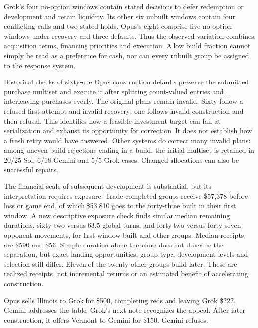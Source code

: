 Grok's four no-option windows contain stated decisions to defer redemption or development and retain liquidity. Its other six unbuilt windows contain four conflicting calls and two stated holds. Opus's eight comprise five no-option windows under recovery and three defaults. Thus the observed variation combines acquisition terms, financing priorities and execution. A low build fraction cannot simply be read as a preference for cash, nor can every unbuilt group be assigned to the response system.

Historical checks of sixty-one Opus construction defaults preserve the submitted purchase multiset and execute it after splitting count-valued entries and interleaving purchases evenly. The original plans remain invalid. Sixty follow a refused first attempt and invalid recovery; one follows invalid construction and then refusal. This identifies how a feasible investment target can fail at serialization and exhaust its opportunity for correction. It does not establish how a fresh retry would have answered. Other systems do correct many invalid plans: among uneven-build rejections ending in a build, the initial multiset is retained in 20/25 Sol, 6/18 Gemini and 5/5 Grok cases. Changed allocations can also be successful repairs.

The financial scale of subsequent development is substantial, but its interpretation requires exposure. Trade-completed groups receive \$57,378 before loss or game end, of which \$53,810 goes to the forty-three built in their first window. A new descriptive exposure check finds similar median remaining durations, sixty-two versus 63.5 global turns, and forty-two versus forty-seven opponent movements, for first-window-built and other groups. Median receipts are \$590 and \$56. Simple duration alone therefore does not describe the separation, but exact landing opportunities, group type, development levels and selection still differ. Eleven of the twenty other groups build later. These are realized receipts, not incremental returns or an estimated benefit of accelerating construction.

Opus sells Illinois to Grok for \$500, completing reds and leaving Grok \$222. Gemini addresses the table:
Grok's next note recognizes the appeal. After later construction, it offers Vermont to Gemini for \$150. Gemini refuses:

